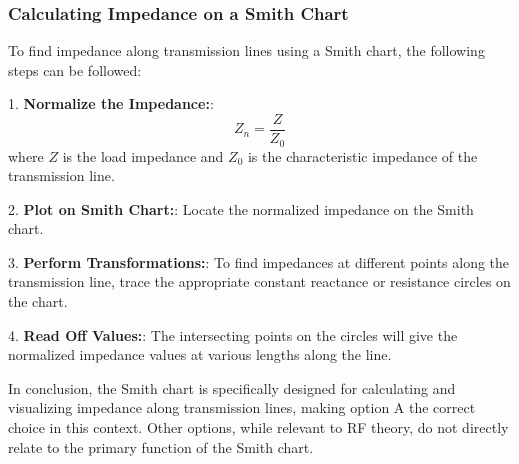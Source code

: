 \subsubsection{Calculating Impedance on a Smith Chart}

To find impedance along transmission lines using a Smith chart, the following steps can be followed:

1. \textbf{Normalize the Impedance:}: 
   \[
   Z_n = \frac{Z}{Z_0}
   \]
   where \(Z\) is the load impedance and \(Z_0\) is the characteristic impedance of the transmission line.

2. \textbf{Plot on Smith Chart:}: Locate the normalized impedance on the Smith chart.

3. \textbf{Perform Transformations:}: To find impedances at different points along the transmission line, trace the appropriate constant reactance or resistance circles on the chart.

4. \textbf{Read Off Values:}: The intersecting points on the circles will give the normalized impedance values at various lengths along the line.


In conclusion, the Smith chart is specifically designed for calculating and visualizing impedance along transmission lines, making option A the correct choice in this context. Other options, while relevant to RF theory, do not directly relate to the primary function of the Smith chart.
